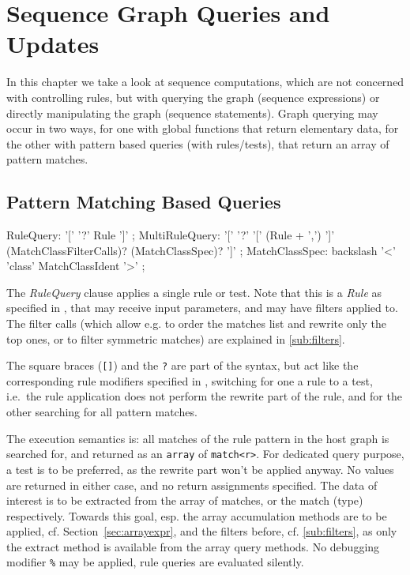 \chapter{Sequence Graph Queries and Updates}\label{cha:graphquery}%

In this chapter we take a look at sequence computations, which are not concerned with controlling rules, but with querying the graph (sequence expressions) or directly manipulating the graph (sequence statements).
Graph querying may occur in two ways, for one with global functions that return elementary data, for the other with pattern based queries (with rules/tests), that return an array of pattern matches.

\section{Pattern Matching Based Queries}

\begin{rail}
  RuleQuery: '[' '?' Rule ']' ;
  MultiRuleQuery: '[' '?' '[' (Rule + ',') ']' (MatchClassFilterCalls)? (MatchClassSpec)? ']' ;
	MatchClassSpec: backslash '<' 'class' MatchClassIdent '>' ;
\end{rail}

The \emph{RuleQuery} clause applies a single rule or test.
Note that this is a \emph{Rule} as specified in \label{sec:ruleapplication}, that may receive input parameters, and may have filters applied to.
The filter calls (which allow e.g. to order the matches list and rewrite only the top ones, or to filter symmetric matches) are explained in \ref{sub:filters}.

The square braces (\texttt{[]}) and the \texttt{?} are part of the syntax, but act like the corresponding rule modifiers specified in \label{sec:ruleapplication}, switching for one a rule to a test, i.e.\ the rule application does not perform the rewrite part of the rule, and for the other searching for all pattern matches.

The execution semantics is: all matches of the rule pattern in the host graph is searched for, and returned as an \texttt{array} of \texttt{match<r>}.
For dedicated query purpose, a test is to be preferred, as the rewrite part won't be applied anyway. 
No values are returned in either case, and no return assignments specified.
The data of interest is to be extracted from the array of matches, or the match (type) respectively.
Towards this goal, esp. the array accumulation methods are to be applied, cf. Section~\ref{sec:arrayexpr}, and the filters before, cf. \ref{sub:filters}, as only the extract method is available from the array query methods.
No debugging modifier \texttt{\%} may be applied, rule queries are evaluated silently.

